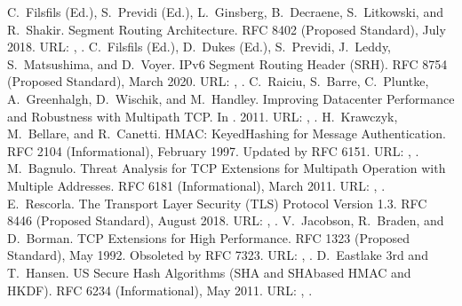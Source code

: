 \documentclass[letterpaper,10pt,english]{sphinxmanual}
\begin{document}
\begin{sphinxthebibliography}{10}
\sphinxAtStartPar
C. Filsfils (Ed.), S. Previdi (Ed.), L. Ginsberg, B. Decraene, S. Litkowski, and R. Shakir. Segment Routing Architecture. RFC 8402 (Proposed Standard), July 2018. URL: , .
\sphinxAtStartPar
C. Filsfils (Ed.), D. Dukes (Ed.), S. Previdi, J. Leddy, S. Matsushima, and D. Voyer. IPv6 Segment Routing Header (SRH). RFC 8754 (Proposed Standard), March 2020. URL: , .
\sphinxAtStartPar
C. Raiciu, S. Barre, C. Pluntke, A. Greenhalgh, D. Wischik, and M. Handley. Improving Datacenter Performance and Robustness with Multipath TCP. In . 2011. URL: , .
\sphinxAtStartPar
H. Krawczyk, M. Bellare, and R. Canetti. HMAC: Keyed\sphinxhyphen{}Hashing for Message Authentication. RFC 2104 (Informational), February 1997. Updated by RFC 6151. URL: , .
\sphinxAtStartPar
M. Bagnulo. Threat Analysis for TCP Extensions for Multipath Operation with Multiple Addresses. RFC 6181 (Informational), March 2011. URL: , .
\sphinxAtStartPar
E. Rescorla. The Transport Layer Security (TLS) Protocol Version 1.3. RFC 8446 (Proposed Standard), August 2018. URL: , .
\sphinxAtStartPar
V. Jacobson, R. Braden, and D. Borman. TCP Extensions for High Performance. RFC 1323 (Proposed Standard), May 1992. Obsoleted by RFC 7323. URL: , .
\sphinxAtStartPar
D. Eastlake 3rd and T. Hansen. US Secure Hash Algorithms (SHA and SHA\sphinxhyphen{}based HMAC and HKDF). RFC 6234 (Informational), May 2011. URL: , .

\end{sphinxthebibliography}
\end{document}
